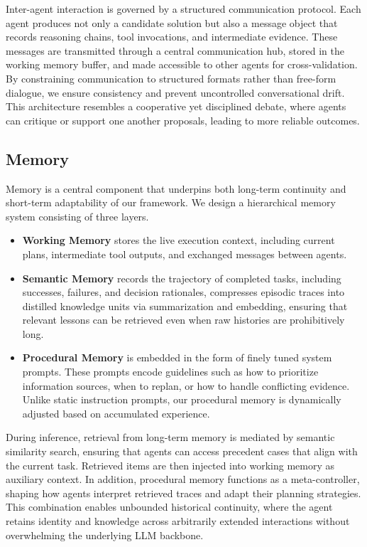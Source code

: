 Inter-agent interaction is governed by a structured communication protocol. Each agent produces not only a candidate solution but also a message object that records reasoning chains, tool invocations, and intermediate evidence. These messages are transmitted through a central communication hub, stored in the working memory buffer, and made accessible to other agents for cross-validation. By constraining communication to structured formats rather than free-form dialogue, we ensure consistency and prevent uncontrolled conversational drift. This architecture resembles a cooperative yet disciplined debate, where agents can critique or support one another proposals, leading to more reliable outcomes.

\subsection{Memory}

Memory is a central component that underpins both long-term continuity and short-term adaptability of our framework. We design a hierarchical memory system consisting of three layers.

\begin{itemize}
    \item \textbf{Working Memory}
    stores the live execution context, including current plans, intermediate tool outputs, and exchanged messages between agents.
    \item \textbf{Semantic Memory}
    records the trajectory of completed tasks, including successes, failures, and decision rationales, compresses episodic traces into distilled knowledge units via summarization and embedding, ensuring that relevant lessons can be retrieved even when raw histories are prohibitively long.
    \item \textbf{Procedural Memory}
     is embedded in the form of finely tuned system prompts. These prompts encode guidelines such as how to prioritize information sources, when to replan, or how to handle conflicting evidence. Unlike static instruction prompts, our procedural memory is dynamically adjusted based on accumulated experience.
\end{itemize}

During inference, retrieval from long-term memory is mediated by semantic similarity search, ensuring that agents can access precedent cases that align with the current task. Retrieved items are then injected into working memory as auxiliary context. In addition, procedural memory functions as a meta-controller, shaping how agents interpret retrieved traces and adapt their planning strategies. This combination enables unbounded historical continuity, where the agent retains identity and knowledge across arbitrarily extended interactions without overwhelming the underlying LLM backbone.



